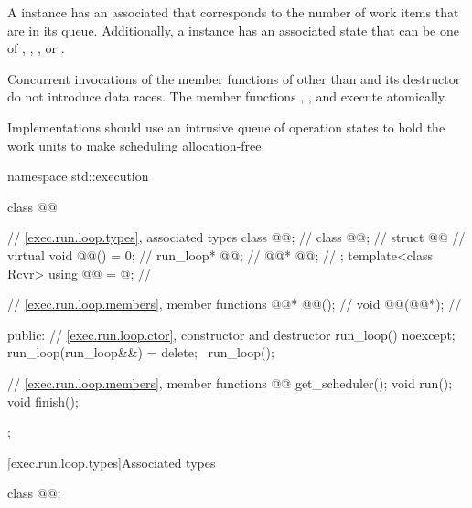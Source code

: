 \pnum
A  instance has an associated 
that corresponds to the number of work items that are in its queue.
Additionally, a  instance has an associated state
that can be one of
, , , or .

\pnum
Concurrent invocations of the member functions of 
other than  and its destructor do not introduce data races.
The member functions
, , and 
execute atomically.

\pnum
\recommended
Implementations should use an intrusive queue of operation states
to hold the work units to make scheduling allocation-free.

\begin{codeblock}
namespace std::execution {
  class @@ {
    // \ref{exec.run.loop.types}, associated types
    class @@;                                   // \expos
    class @@;                                      // \expos
    struct @@ {                              // \expos
      virtual void @@() = 0;                               // \expos
      run_loop* @@;                                           // \expos
      @@* @@;                              // \expos
    };
    template<class Rcvr>
      using @@ = @\unspec@;                     // \expos

    // \ref{exec.run.loop.members}, member functions
    @@* @@();                         // \expos
    void @@(@@*);                     // \expos

  public:
    // \ref{exec.run.loop.ctor}, constructor and destructor
    run_loop() noexcept;
    run_loop(run_loop&&) = delete;
    ~run_loop();

    // \ref{exec.run.loop.members}, member functions
    @@ get_scheduler();
    void run();
    void finish();
  };
}
\end{codeblock}

[exec.run.loop.types]{Associated types}

\begin{itemdecl}
class @@;
\end{itemdecl}

